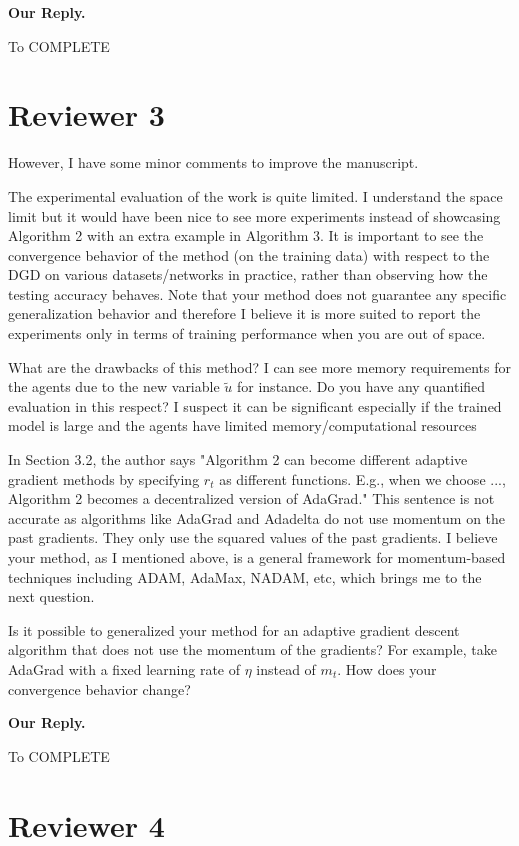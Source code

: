 \documentclass{article} %
\begin{document}
\textbf{Our Reply.}

To COMPLETE



\section{Reviewer 3}
\vspace{-0.1in}

However, I have some minor comments to improve the manuscript.

The experimental evaluation of the work is quite limited. I understand the space limit but it would have been nice to see more experiments instead of showcasing Algorithm 2 with an extra example in Algorithm 3. It is important to see the convergence behavior of the method (on the training data) with respect to the DGD on various datasets/networks in practice, rather than observing how the testing accuracy behaves. Note that your method does not guarantee any specific generalization behavior and therefore I believe it is more suited to report the experiments only in terms of training performance when you are out of space.

What are the drawbacks of this method? I can see more memory requirements for the agents due to the new variable $\tilde{u}$ for instance. Do you have any quantified evaluation in this respect? I suspect it can be significant especially if the trained model is large and the agents have limited memory/computational resources

In Section 3.2, the author says "Algorithm 2 can become different adaptive gradient methods by specifying $r_t$ as different functions. E.g., when we choose ..., Algorithm 2 becomes a decentralized version of AdaGrad." This sentence is not accurate as algorithms like AdaGrad and Adadelta do not use momentum on the past gradients. They only use the squared values of the past gradients. I believe your method, as I mentioned above, is a general framework for momentum-based techniques including ADAM, AdaMax, NADAM, etc, which brings me to the next question.

Is it possible to generalized your method for an adaptive gradient descent algorithm that does not use the momentum of the gradients? For example, take AdaGrad with a fixed learning rate of $\eta$ instead of $m_t$. How does your convergence behavior change?

\textbf{Our Reply.}

To COMPLETE


\section{Reviewer 4}
\vspace{-0.1in}
\end{document}
